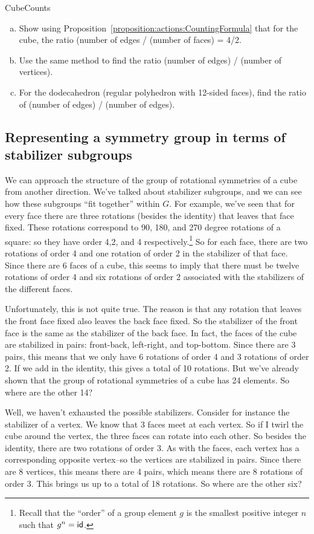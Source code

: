 \begin{exercise}{CubeCounts}
\begin{enumerate}[(a)]
\item
Show using Proposition~\ref{proposition:actions:CountingFormula} that for the cube, the ratio (number of edges / (number of  faces) = 4/2. 
\item Use the same method to find the ratio (number of edges) / (number of vertices).
\item For the dodecahedron (regular polyhedron with 12-sided faces), find the ratio of (number of edges) / (number of edges).
\end{enumerate}
\end{exercise} 

\subsection{Representing a symmetry group in terms of stabilizer subgroups}
We can approach the structure of the group of rotational symmetries of a cube from another direction.  We've talked about stabilizer subgroups, and we can see how these subgroups ``fit together'' within $G$.
For example, we've seen that for every face there are three rotations (besides the identity) that leaves that face fixed. These rotations correspond to 90, 180, and 270 degree rotations of a square: so they have order 4,2, and 4 respectively.\footnote{Recall that the ``order'' of a group element $g$ is the smallest positive integer $n$ such that $g^n = \sf{id}$.} So for each face, there are two rotations of order 4 and one rotation of order 2 in the stabilizer of that face. Since there are 6 faces of a cube, this seems to imply that there must be twelve rotations of order 4 and six rotations of order 2 associated with the stabilizers of the different faces.  

Unfortunately, this is not quite true. The reason is that any rotation that leaves the front face fixed also leaves the back face fixed. So the stabilizer of the front face is the same as the stabilizer  of the back face. In fact, the faces of the cube are stabilized in pairs: front-back, left-right, and top-bottom. Since there are 3 pairs, this means that we only have 6 rotations of order 4 and 3 rotations of order 2. If we add in the identity, this gives a total of 10 rotations. But we've already shown that the group of rotational symmetries of a cube has 24 elements. So where are the other 14?

Well, we haven't exhausted the possible stabilizers. Consider for instance the stabilizer of a vertex. We know that 3 faces meet at each vertex. So if I twirl the cube around the vertex, the three faces can rotate into each other. So besides the identity, there are two rotations of order 3. As with the faces, each vertex has a corresponding opposite vertex--so the vertices are stabilized in pairs. Since there are 8 vertices, this means there are 4 pairs, which means there are 8 rotations of order 3. This brings us up to a total of 18 rotations. So where are the other six?

